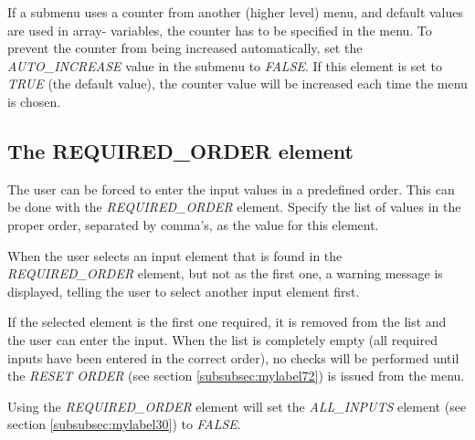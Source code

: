 \documentclass[a4paper]{book}
\newcommand{\vs}{\vspace{3mm}}
\begin{document}
If a submenu uses a counter from another (higher level) menu, and default 
values are used in array- variables, the counter has to be specified in the 
menu. To prevent the counter from being increased automatically, set the 
\textsl{AUTO{\_}INCREASE} value in the submenu to \textsl{FALSE}. If this element is set to 
\textsl{TRUE} (the default value), the counter value will be increased each time the 
menu is chosen.

\subsection{The REQUIRED{\_}ORDER element}
\label{subsubsec:mylabel29}

The user can be forced to enter the input values in a predefined order. This 
can be done with the \textsl{REQUIRED{\_}ORDER} element. Specify the list of values 
in the proper order, separated by comma's, as the value for this element.

\vs

When the user selects an input element that is found in the 
\linebreak\textsl{REQUIRED{\_}ORDER} element, but not as the first one, a warning message is 
displayed, telling the user to select another input element first.

\vs

If the selected element is the first one required, it is removed from the 
list and the user can enter the input. When the list is completely empty 
(all required inputs have been entered in the correct order), no checks will 
be performed until the \textsl{RESET ORDER} (see section 
\ref{subsubsec:mylabel72}) is issued from the menu.

\vs

Using the \textsl{REQUIRED{\_}ORDER} element will set the \textsl{ALL{\_}INPUTS} element (see 
section \ref{subsubsec:mylabel30}) to \textsl{FALSE}.
\end{document}
